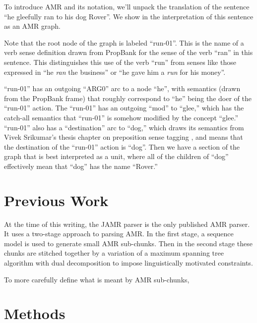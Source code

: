 \documentclass[11pt]{article}
\begin{document}

To introduce AMR and its notation, we'll unpack the translation of the sentence ``he gleefully ran to his dog Rover''. We show in  the interpretation of this sentence as an AMR graph.

Note that the root node of the graph is labeled ``run-01''. This is the name of a verb sense definition drawn from PropBank \needcite for the sense of the verb ``ran'' in this sentence. This distinguishes this use of the verb ``run'' from senses like those expressed in ``he \textit{ran} the business'' or ``he gave him a \textit{run} for his money''.

``run-01'' has an outgoing ``ARG0'' arc to a node ``he'', with semantics (drawn from the PropBank frame) that roughly correspond to ``he'' being the doer of the ``run-01'' action. The ``run-01'' has an outgoing ``mod'' to ``glee,'' which has the catch-all semantics that ``run-01'' is somehow modified by the concept ``glee.'' ``run-01'' also has a ``destination'' arc to ``dog,'' which draws its semantics from Vivek Srikumar's thesis chapter on preposition sense tagging \needcite, and means that the destination of the ``run-01'' action is ``dog''. Then we have a section of the graph that is best interpreted as a unit, where all of the children of ``dog'' effectively mean that ``dog'' has the name ``Rover.''


\section{Previous Work}

At the time of this writing, the JAMR parser \cite{Flanigan:14} is the only published AMR parser. It uses a two-stage approach to parsing AMR. In the first stage, a sequence model is used to generate small AMR sub-chunks. Then in the second stage these chunks are stitched together by a variation of a maximum spanning tree algorithm with dual decomposition to impose linguistically motivated constraints.

To more carefully define what is meant by AMR sub-chunks, 

\section{Methods}
\end{document}

